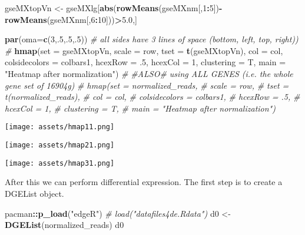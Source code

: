 \documentclass[
]{article}
\newenvironment{Shaded}{\begin{snugshade}}{\end{snugshade}}
\newcommand{\AttributeTok}[1]{\textcolor[rgb]{0.13,0.29,0.53}{#1}}
\newcommand{\CommentTok}[1]{\textcolor[rgb]{0.56,0.35,0.01}{\textit{#1}}}
\newcommand{\DecValTok}[1]{\textcolor[rgb]{0.00,0.00,0.81}{#1}}
\newcommand{\FloatTok}[1]{\textcolor[rgb]{0.00,0.00,0.81}{#1}}
\newcommand{\FunctionTok}[1]{\textcolor[rgb]{0.13,0.29,0.53}{\textbf{#1}}}
\newcommand{\NormalTok}[1]{#1}
\newcommand{\OtherTok}[1]{\textcolor[rgb]{0.56,0.35,0.01}{#1}}
\newcommand{\SpecialCharTok}[1]{\textcolor[rgb]{0.81,0.36,0.00}{\textbf{#1}}}
\newcommand{\StringTok}[1]{\textcolor[rgb]{0.31,0.60,0.02}{#1}}
\begin{document}
\begin{Shaded}
\begin{Highlighting}[]
\NormalTok{gseMXtopVn }\OtherTok{\textless{}{-}}\NormalTok{ gseMXlg[}\FunctionTok{abs}\NormalTok{(}\FunctionTok{rowMeans}\NormalTok{(gseMXnm[,}\DecValTok{1}\SpecialCharTok{:}\DecValTok{5}\NormalTok{])}\SpecialCharTok{{-}}\FunctionTok{rowMeans}\NormalTok{(gseMXnm[,}\DecValTok{6}\SpecialCharTok{:}\DecValTok{10}\NormalTok{]))}\SpecialCharTok{\textgreater{}}\FloatTok{5.0}\NormalTok{,]}

\FunctionTok{par}\NormalTok{(}\AttributeTok{oma=}\FunctionTok{c}\NormalTok{(}\DecValTok{3}\NormalTok{,.}\DecValTok{5}\NormalTok{,.}\DecValTok{5}\NormalTok{,.}\DecValTok{5}\NormalTok{)) }\CommentTok{\# all sides have 3 lines of space (bottom, left, top, right)) }
\CommentTok{\#}
\FunctionTok{hmap}\NormalTok{(}\AttributeTok{set =}\NormalTok{ gseMXtopVn,}
     \AttributeTok{scale =} \StringTok{\textquotesingle{}row\textquotesingle{}}\NormalTok{,}
     \AttributeTok{tset =} \FunctionTok{t}\NormalTok{(gseMXtopVn),}
     \AttributeTok{col =}\NormalTok{ col,}
     \AttributeTok{colsidecolors =}\NormalTok{ colbars1,}
     \AttributeTok{hcexRow =}\NormalTok{ .}\DecValTok{5}\NormalTok{,}
     \AttributeTok{hcexCol =} \DecValTok{1}\NormalTok{,}
     \AttributeTok{clustering =}\NormalTok{ T,}
     \AttributeTok{main =} \StringTok{"Heatmap after normalization"}\NormalTok{)}
\CommentTok{\#}
\CommentTok{\#ALSO\# using ALL GENES (i.e. the whole gene set of 16904g) }
\CommentTok{\# hmap(set = normalized\_reads,}
\CommentTok{\#      scale = \textquotesingle{}row\textquotesingle{},}
\CommentTok{\#      tset = t(normalized\_reads),}
\CommentTok{\#      col = col,}
\CommentTok{\#      colsidecolors = colbars1,}
\CommentTok{\#      hcexRow = .5,}
\CommentTok{\#      hcexCol = 1,}
\CommentTok{\#      clustering = T,}
\CommentTok{\#      main = "Heatmap after normalization")}
\end{Highlighting}
\end{Shaded}

\texttt{[image: assets/hmap11.png]}

\texttt{[image: assets/hmap21.png]}

\texttt{[image: assets/hmap31.png]}

After this we can perform differential expression. The first step is to
create a DGEList object.

\begin{Shaded}
\begin{Highlighting}[]
\NormalTok{pacman}\SpecialCharTok{::}\FunctionTok{p\_load}\NormalTok{(}\StringTok{"edgeR"}\NormalTok{)}
\CommentTok{\# load("datafiles4de.Rdata")}
\NormalTok{d0 }\OtherTok{\textless{}{-}} \FunctionTok{DGEList}\NormalTok{(normalized\_reads)}
\NormalTok{d0}
\end{Highlighting}
\end{Shaded}
\end{document}
